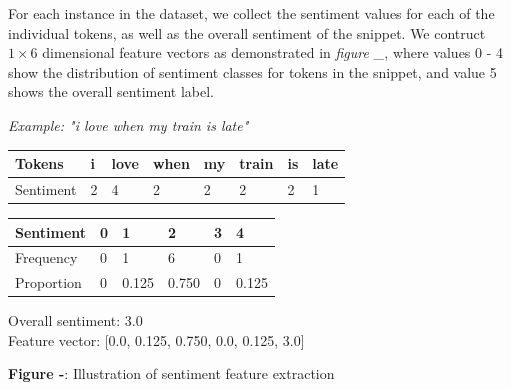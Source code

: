 \documentclass[12pt,a4paper]{article}
\begin{document}
\hspace{-18pt}\begin{minipage}{0.4\textwidth}
	\vspace{-3pt}
	For each instance in the dataset, we collect the sentiment values for each of the individual tokens, as well as the overall sentiment of the snippet. We contruct $ 1 \times 6 $ dimensional feature vectors as demonstrated in \textit{figure \_}, where values 0 - 4 show the distribution of sentiment classes for tokens in the snippet, and value 5 shows the overall sentiment label.\\
\end{minipage}\hspace{15pt}\begin{minipage}{0.55\textwidth}
	\vspace{-10pt}\textit{Example: "i love when my train is late"}\vspace{-15pt}
	\begin{center}	
		\begin{tabular}{|m{1.8cm}||m{0.4cm}m{0.6cm}m{0.75cm}m{0.4cm}m{0.7cm}m{0.2cm}m{0.6cm}|}
			\hline 
			\textbf{Tokens} & \textbf{i} & \textbf{love} & \textbf{when} & \textbf{my} & \textbf{train} & \textbf{is} & \textbf{late}\\ 
			\hline 
			Sentiment & 2 & 4 & 2 & 2 & 2 & 2 & 1\\ 
			\hline 
		\end{tabular}
		\vspace{5pt}
		
		\begin{tabular}{|p{1.8cm}||p{0.9cm}|p{0.9cm}|p{0.9cm}|p{0.9cm}|p{0.9cm}|} 
			\hline 
			\textbf{Sentiment} & \textbf{0} & \textbf{1} & \textbf{2} & \textbf{3} & \textbf{4}\\ 
			\hline 
			Frequency & 0 & 1 & 6 & 0 & 1\\ 
			Proportion & 0 & 0.125 & 0.750 & 0 & 0.125\\
			\hline  
		\end{tabular}
	\end{center}
	Overall sentiment: 3.0\\
	Feature vector: [0.0, 0.125, 0.750, 0.0, 0.125, 3.0]\\\vspace{-20pt}
	\begin{center}
		\textbf{Figure -}: Illustration of sentiment feature extraction
	\end{center}
\end{minipage}
\end{document}
